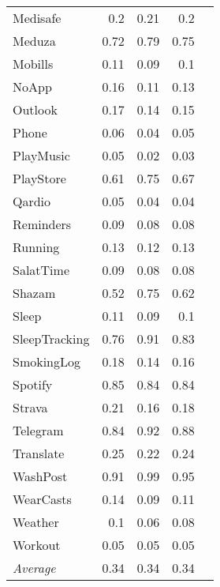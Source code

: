 \begin{tabular}{lrrrr}
    Medisafe & 0.2 & 0.21 & 0.2 \\
    Meduza & 0.72 & 0.79 & 0.75 \\
    Mobills & 0.11 & 0.09 & 0.1 \\
    NoApp & 0.16 & 0.11 & 0.13 \\
    Outlook & 0.17 & 0.14 & 0.15 \\
    Phone & 0.06 & 0.04 & 0.05 \\
    PlayMusic & 0.05 & 0.02 & 0.03 \\
    PlayStore & 0.61 & 0.75 & 0.67 \\
    Qardio & 0.05 & 0.04 & 0.04 \\
    Reminders & 0.09 & 0.08 & 0.08 \\
    Running & 0.13 & 0.12 & 0.13 \\
    SalatTime & 0.09 & 0.08 & 0.08 \\
    Shazam & 0.52 & 0.75 & 0.62 \\
    Sleep & 0.11 & 0.09 & 0.1 \\
    SleepTracking & 0.76 & 0.91 & 0.83 \\
    SmokingLog & 0.18 & 0.14 & 0.16 \\
    Spotify & 0.85 & 0.84 & 0.84 \\
    Strava & 0.21 & 0.16 & 0.18 \\
    Telegram & 0.84 & 0.92 & 0.88 \\
    Translate & 0.25 & 0.22 & 0.24 \\
    WashPost & 0.91 & 0.99 & 0.95 \\
    WearCasts & 0.14 & 0.09 & 0.11 \\
    Weather & 0.1 & 0.06 & 0.08 \\
    Workout & 0.05 & 0.05 & 0.05 \\
    \emph{Average} & 0.34 & 0.34 & 0.34 \\
\end{tabular}